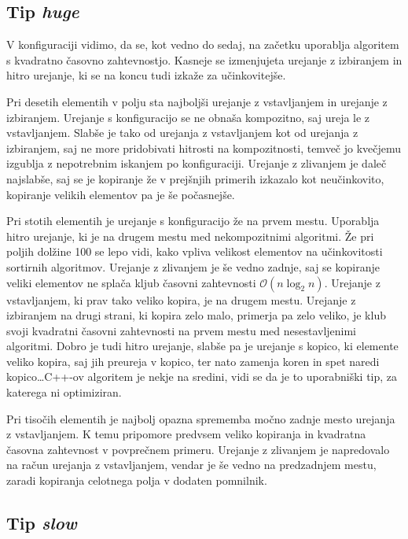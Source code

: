 \documentclass[a4paper,oneside,12pt]{article}
\begin{document}
\subsection{Tip \emph{huge}}
V konfiguraciji vidimo, da se, kot vedno do sedaj, na začetku uporablja algoritem s kvadratno
časovno zahtevnostjo. Kasneje se izmenjujeta urejanje z izbiranjem in hitro
urejanje, ki se na koncu tudi izkaže za učinkovitejše.

Pri desetih elementih v polju sta najboljši urejanje z vstavljanjem in urejanje
z izbiranjem. Urejanje s konfiguracijo se ne obnaša kompozitno, saj ureja le z
vstavljanjem. Slabše je tako od urejanja z vstavljanjem kot od urejanja z
izbiranjem, saj ne more pridobivati hitrosti na kompozitnosti, temveč jo
kvečjemu izgublja z nepotrebnim iskanjem po konfiguraciji. Urejanje z zlivanjem
je daleč najslabše, saj se je  kopiranje že v prejšnjih primerih izkazalo kot
neučinkovito, kopiranje velikih elementov pa je še počasnejše. 

Pri stotih elementih je urejanje s konfiguracijo že na prvem mestu. Uporablja
hitro urejanje, ki je na drugem mestu med nekompozitnimi algoritmi. Že pri
poljih dolžine 100 se lepo
vidi, kako vpliva velikost elementov na učinkovitosti sortirnih algoritmov.
Urejanje z zlivanjem je še vedno zadnje, saj se kopiranje veliki elementov ne
splača kljub časovni zahtevnosti $\mathcal{O}(n\log_2 n)$. Urejanje z
vstavljanjem, ki prav tako veliko kopira, je na drugem mestu. Urejanje z
izbiranjem na drugi strani, ki kopira zelo malo, primerja pa zelo veliko, je
klub svoji kvadratni časovni zahtevnosti na prvem mestu med nesestavljenimi
algoritmi. Dobro je tudi hitro urejanje, slabše pa je urejanje s kopico, ki
elemente veliko kopira, saj jih preureja v kopico, ter nato zamenja koren in spet
naredi kopico\dots C++-ov algoritem je nekje na sredini, vidi se da je to
uporabniški tip, za katerega ni optimiziran.

Pri tisočih elementih je najbolj opazna sprememba močno zadnje mesto urejanja z
vstavljanjem. K temu pripomore predvsem veliko kopiranja in kvadratna časovna
zahtevnost v povprečnem primeru. Urejanje z zlivanjem je napredovalo na račun
urejanja z vstavljanjem, vendar je še vedno na predzadnjem mestu, zaradi
kopiranja celotnega polja v dodaten pomnilnik. 



\subsection{Tip \emph{slow}}
\end{document}
